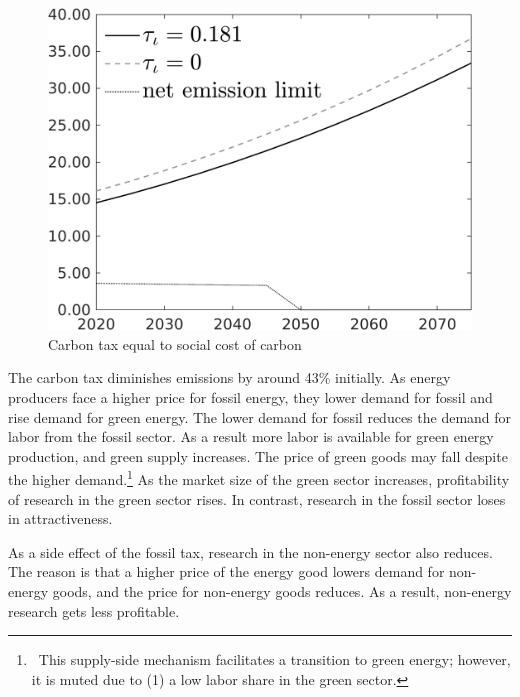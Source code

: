 \begin{figure}[h!!]
	\centering
	\caption{Carbon tax equal to social cost of carbon }\label{fig:Leveltauf_nsk0_xgr0_noknow_notaul}
\begin{minipage}[]{0.4\textwidth}
	\includegraphics[width=1\textwidth]{../../codding_model/own_basedOnFried/optimalPol_010922_revision/figures/all_13Sept22/CompTauf_bytaul_Reg0_Emnet_spillover0_nsk0_xgr0_knspil0_sep1_LFlimit0_emsbase0_countec0_GovRev0_etaa0.79_lgd1.png}
\end{minipage}	

\end{figure} 
 The carbon tax diminishes emissions by around 43\% initially. As energy producers face a higher price for fossil energy, they lower demand for fossil and rise demand for green energy. The lower demand for fossil reduces the demand for labor from the fossil sector. As a result more labor is available for green energy production, and green supply increases. The price of green goods may fall despite the higher demand.\footnote{\ This supply-side mechanism facilitates a transition to green energy; however, it is muted due to (1) a low labor share in the green sector.}
 As the market size of the green sector increases, profitability of research in the green sector rises. In contrast, research in the fossil sector loses in attractiveness. 
 
 As a side effect of the fossil tax, research in the non-energy sector also reduces. The reason is that a higher price of the energy good lowers demand for non-energy goods, and the price for non-energy goods reduces. As a result, non-energy research gets less profitable. 
 
